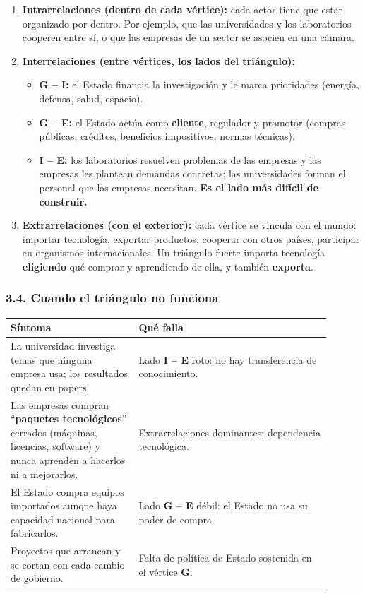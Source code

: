 \begin{enumerate}
  \item \textbf{Intrarrelaciones (dentro de cada vértice):} cada actor tiene que estar
        organizado por dentro. Por ejemplo, que las universidades y los laboratorios
        cooperen entre sí, o que las empresas de un sector se asocien en una cámara.
  \item \textbf{Interrelaciones (entre vértices, los lados del triángulo):}
  \begin{itemize}
    \item \textbf{G -- I:} el Estado financia la investigación y le marca prioridades
          (energía, defensa, salud, espacio).
    \item \textbf{G -- E:} el Estado actúa como \textbf{cliente}, regulador y promotor
          (compras públicas, créditos, beneficios impositivos, normas técnicas).
    \item \textbf{I -- E:} los laboratorios resuelven problemas de las empresas y las
          empresas les plantean demandas concretas; las universidades forman el personal que
          las empresas necesitan. \textbf{Es el lado más difícil de construir.}
  \end{itemize}
  \item \textbf{Extrarrelaciones (con el exterior):} cada vértice se vincula con el mundo:
        importar tecnología, exportar productos, cooperar con otros países, participar en
        organismos internacionales. Un triángulo fuerte importa tecnología \textbf{eligiendo}
        qué comprar y aprendiendo de ella, y también \textbf{exporta}.
\end{enumerate}

\subsubsection*{3.4. Cuando el triángulo no funciona}
\begin{center}
\small
\begin{tabular}{|p{0.36\linewidth}|p{0.54\linewidth}|}
\hline
\textbf{Síntoma} & \textbf{Qué falla} \\ \hline
La universidad investiga temas que ninguna empresa usa; los resultados quedan en papers. &
Lado \textbf{I -- E} roto: no hay transferencia de conocimiento. \\ \hline
Las empresas compran ``\textbf{paquetes tecnológicos}'' cerrados (máquinas, licencias,
software) y nunca aprenden a hacerlos ni a mejorarlos. & Extrarrelaciones dominantes:
dependencia tecnológica. \\ \hline
El Estado compra equipos importados aunque haya capacidad nacional para fabricarlos. & Lado
\textbf{G -- E} débil: el Estado no usa su poder de compra. \\ \hline
Proyectos que arrancan y se cortan con cada cambio de gobierno. & Falta de política de Estado
sostenida en el vértice \textbf{G}. \\ \hline
\end{tabular}
\end{center}

